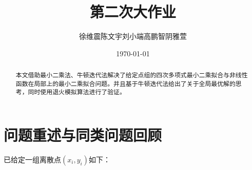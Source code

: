 \documentclass[UTF8]{ctexart}
\begin{document}
\title{第二次大作业}
%
\author{徐维震\quad 陈文宇\quad 刘小端\quad 高鹏智\quad 阴雅萱}

\date{\today}

\maketitle{}
\begin{abstract}
	本文借助最小二乘法、牛顿迭代法解决了给定点组的四次多项式最小二乘拟合与非线性函数在局部上的最小二乘拟合问题。并且基于牛顿迭代法给出了关于全局最优解的思考，同时使用退火模拟算法进行了验证。
\end{abstract}

\newpage
\tableofcontents
\newpage

\section{问题重述与同类问题回顾}


已给定一组离散点$(x_{i},y_{i})$如下：\\
\begin{table}[h]
	\centering
	\caption{离散点组}
\end{table}
\end{document}
